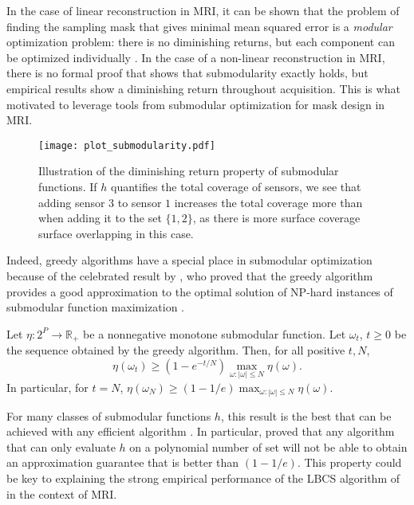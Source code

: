 In the case of linear reconstruction in MRI, it can be shown that the problem of finding the sampling mask that gives minimal mean squared error is a \textit{modular} optimization problem: there is no diminishing returns, but each component can be optimized individually \citep{baldassarre2016learning}. In the case of a non-linear reconstruction in MRI, there is no formal proof that shows that submodularity exactly holds, but empirical results show a diminishing return throughout acquisition. This is what motivated \citet{gozcu2018learning} to leverage tools from submodular optimization for mask design in MRI. 

\begin{figure}[!ht]
    \centering
    \texttt{[image: plot\_submodularity.pdf]}
    \caption{Illustration of the diminishing return property of submodular functions. If $h$ quantifies the total coverage of sensors, we see that adding sensor $3$ to sensor $1$ increases the total coverage more than when adding it to the set $\{1,2\}$, as there is more surface coverage surface overlapping in this case.} \label{fig:submodularity}
\end{figure}

Indeed, greedy algorithms have a special place in submodular optimization because of the celebrated result by \citet{nemhauser1978analysis}, who proved that the greedy algorithm provides a good approximation to the optimal solution of NP-hard instances of submodular function maximization \citep{krause2014submodular}. 

\begin{theorem}
    Let $\eta:2^P \to \mathbb{R}_+$ be a nonnegative monotone submodular function. Let ${\omega_t}$, ${t\geq 0}$ be the sequence obtained by the greedy algorithm. Then, for all positive $t, N$,
    \begin{equation}
        \eta(\omega_t) \geq \left(1- e^{-t/N}\right) \max_{\omega:|\omega|\leq N} \eta(\omega).
    \end{equation}
    In particular, for $t=N$, $\eta(\omega_N) \geq  \left(1- 1/e\right) \max_{\omega:|\omega|\leq N} \eta(\omega)$.
\end{theorem}
For many classes of submodular functions $h$, this result is the best that can be achieved  with any efficient algorithm \citep{krause2014submodular}. In particular, \citet{nemhauser1978best} proved that any algorithm that can only evaluate $h$ on a polynomial number of set will not be able to obtain an approximation guarantee that is better than $(1-1/e)$. This property could be key to explaining the strong empirical performance of the LBCS algorithm of \citet{gozcu2018learning} in the context of MRI.


